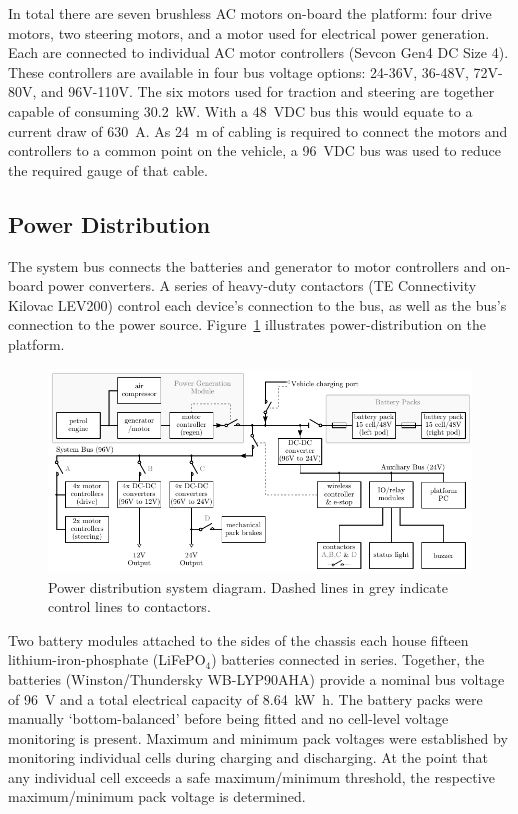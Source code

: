 \documentclass[preprint,authoryear,12pt]{elsarticle}
\begin{document}
        In total there are seven brushless AC motors on-board the platform: four drive motors, two steering motors, and a motor used for electrical power generation.
        Each are connected to individual AC motor controllers (Sevcon Gen4 DC Size 4).
        These controllers are available in four bus voltage options: 24-36V, 36-48V, 72V-80V, and 96V-110V.
        The six motors used for traction and steering are together capable of consuming \SI{30.2}{\kilo\watt}.
        With a \SI{48}{\volt}DC bus this would equate to a current draw of \SI{630}{\ampere}.
        As \SI{24}{\meter} of cabling is required to connect the motors and controllers to a common point on the vehicle, a \SI{96}{\volt}DC bus was used to reduce the required gauge of that cable.


    \subsection{Power Distribution}
    \label{sub:power}
        The system bus connects the batteries and generator to motor controllers and on-board power converters.
        A series of heavy-duty contactors (TE Connectivity Kilovac LEV200) control each device's connection to the bus, as well as the bus's connection to the power source.
        Figure~\ref{fig:power_system_diagram} illustrates power-distribution on the platform.

        \begin{figure}[htb]
            \centering
            \includegraphics[width=\linewidth]{imgs/system_diagram/full-system-diagram_v1.pdf}
            \caption{Power distribution system diagram. Dashed lines in grey indicate control lines to contactors.}
            \label{fig:power_system_diagram}
        \end{figure}

        Two battery modules attached to the sides of the chassis each house fifteen lithium-iron-phosphate (LiFePO$_{\text{4}}$) batteries connected in series.
        Together, the batteries (Winston/Thundersky WB-LYP90AHA) provide a nominal bus voltage of \SI{96}{\volt} and a total electrical capacity of \SI{8.64}{\kilo\watt\hour}.
        The battery packs were manually `bottom-balanced' before being fitted and no cell-level voltage monitoring is present.
        Maximum and minimum pack voltages were established by monitoring individual cells during charging and discharging.
        At the point that any individual cell exceeds a safe maximum/minimum threshold, the respective maximum/minimum pack voltage is determined.
\end{document}
